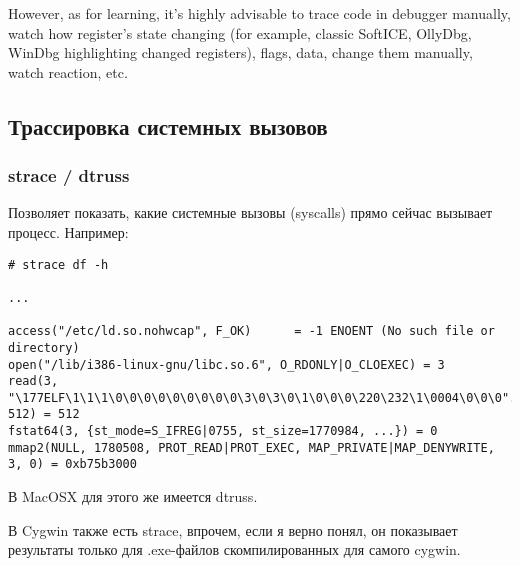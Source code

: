 {However, as for learning, it's highly advisable to trace code in debugger manually, watch how register's state
changing (for example, classic SoftICE, OllyDbg, WinDbg highlighting changed registers), flags, data, change them
manually, watch reaction, etc.}

\subsection{Трассировка системных вызовов}

\subsubsection{strace / dtruss}

Позволяет показать, какие системные вызовы (syscalls) прямо сейчас вызывает процесс. Например:

\begin{lstlisting}
# strace df -h

...

access("/etc/ld.so.nohwcap", F_OK)      = -1 ENOENT (No such file or directory)
open("/lib/i386-linux-gnu/libc.so.6", O_RDONLY|O_CLOEXEC) = 3
read(3, "\177ELF\1\1\1\0\0\0\0\0\0\0\0\0\3\0\3\0\1\0\0\0\220\232\1\0004\0\0\0"..., 512) = 512
fstat64(3, {st_mode=S_IFREG|0755, st_size=1770984, ...}) = 0
mmap2(NULL, 1780508, PROT_READ|PROT_EXEC, MAP_PRIVATE|MAP_DENYWRITE, 3, 0) = 0xb75b3000
\end{lstlisting}

В MacOSX для этого же имеется dtruss.

В Cygwin также есть strace, впрочем, если я верно понял, 
он показывает результаты только для .exe-файлов скомпилированных для самого cygwin.

